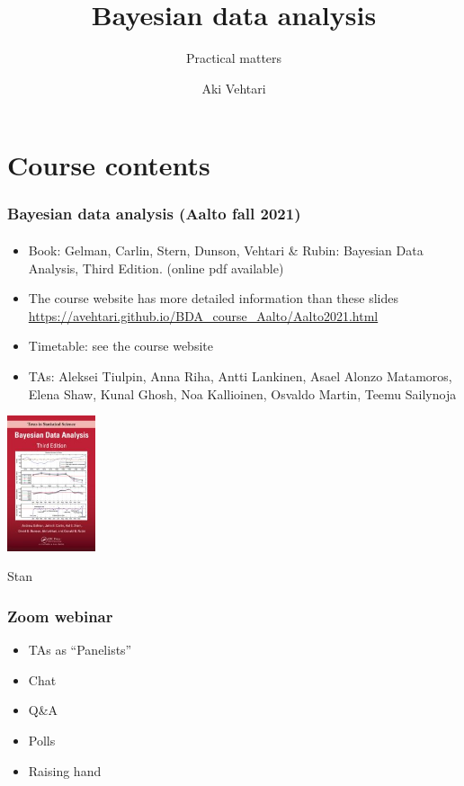 \documentclass[english]{beamer}
\title[]{Bayesian data analysis}
\subtitle{Practical matters}
\author{Aki Vehtari}
\institute[Aalto University]{}
\begin{document}
\section{Course contents}


\begin{frame}
  \frametitle{Bayesian data analysis (Aalto fall 2021)}  %
  \framesubtitle{}
  \begin{itemize}
  \item Book: Gelman, Carlin, Stern, Dunson, Vehtari \& Rubin: Bayesian Data
    Analysis, Third Edition. {\footnotesize (online pdf available)}
  \item The course website has more detailed information than these slides\\
    {\small\url{https://avehtari.github.io/BDA_course_Aalto/Aalto2021.html}}
  \item Timetable: see the course website
  \item TAs: Aleksei Tiulpin, Anna Riha, Antti Lankinen, Asael Alonzo
    Matamoros, Elena Shaw, Kunal Ghosh, Noa Kallioinen, Osvaldo
    Martin, Teemu Sailynoja
    \end{itemize}
    \vspace{-\baselineskip}
 \begin{center}
   \includegraphics[width=2.6cm]{figs/BDA3.jpg}
 \end{center}

\end{frame}

\begin{frame}{Stan}
  \frametitle{Zoom webinar}  %

  \begin{itemize}
  \item TAs as ``Panelists''
  \item Chat
  \item Q\&A
  \item Polls
  \item Raising hand
  \end{itemize}
  
\end{frame}
\end{document}
